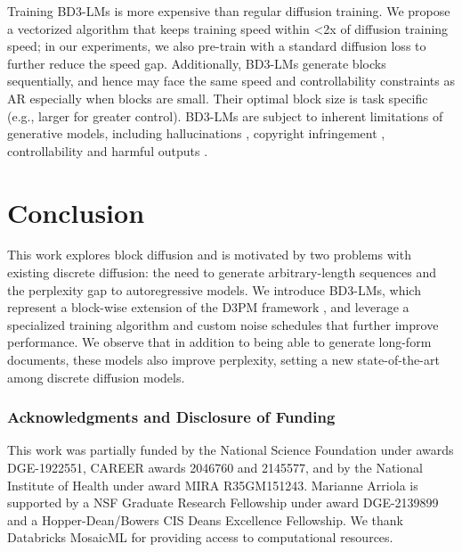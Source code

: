 \documentclass{article} %
\def\algos{BD3-LMs}
\begin{document}
Training \algos{} is more expensive than regular diffusion training. We propose a vectorized algorithm that keeps training speed within <2x of diffusion training speed; in our experiments, we also pre-train with a standard diffusion loss to further reduce the speed gap. Additionally, \algos{} generate blocks sequentially, and hence may face the same speed and controllability constraints as AR especially when blocks are small. Their optimal block size is task specific (e.g., larger for greater control).
\algos{} are subject to inherent limitations of generative models, including hallucinations \citep{achiam2023gpt}, copyright infringement \citep{gokaslan2024commoncanvas}, controllability \citep{schiff2024discreteguidance,wang2023infodiff} and harmful outputs \citep{bai2022constitutional}. %

\section{Conclusion}
This work explores block diffusion and is motivated by two problems with existing discrete diffusion: the need to generate arbitrary-length sequences and the perplexity gap to autoregressive models. We introduce \algos{}, which represent a block-wise extension of the D3PM framework \citep{austin2021structured}, and leverage a specialized training algorithm and custom noise schedules that further improve performance. We observe that in addition to being able to generate long-form documents, these models also improve perplexity, setting a new state-of-the-art among discrete diffusion models.

\subsubsection*{Acknowledgments and Disclosure of Funding}
This work was partially funded by the National Science Foundation under awards DGE-1922551,
CAREER awards 2046760 and 2145577,  and by the National Institute of Health under award MIRA
R35GM151243. Marianne Arriola is supported by a NSF Graduate Research Fellowship under award DGE-2139899 and a Hopper-Dean/Bowers CIS Deans Excellence Fellowship. We thank Databricks MosaicML for providing access to computational resources.
\end{document}
